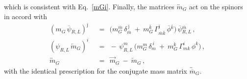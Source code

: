 \documentclass[12pt]{article}
\newcommand{\ov}{\overline}
\newcommand{\bpsi}{\ov{\psi}{}}
\newcommand{\bphi}{\ov{\phi}{}}
\newcommand{\bj}{{\bar \jmath}}
\newcommand{\bk}{{\bar k}}
\newcommand{\bm}{{\bar m}}
\begin{document}
	which is consistent with Eq.~\eqref{mGi}.
	Finally, the matrices $ \overleftrightarrow{m}{}_{\!G} $ act on the spinors in accord with
\begin{align*}
%
	(m_G\, \bpsi_{R,L})^\bj & ~~=~~ 
		\bigl( m_G^\bm\, \delta_{\bm}^{~\bj} ~+~ m_G^\bk\, \Gamma^\bj_{\bm\bk}\, \bphi^\bk \bigr)\, \bpsi_{R,L}^\bm\,,
	\\[2mm]
%
	(\psi_{R,L}\,\overleftarrow{m}{}_{\!G})^i & ~~=~~
		-\, \psi_{R,L}^m\, \bigl( m_G^m\, \delta_m^{~i} ~+~ m_G^k\, \Gamma^i_{mk}\, \phi^k \bigr)\,,
	\\[2mm]
%
	\overleftrightarrow{m}{}_{\!G} & ~~=~~ \overrightarrow{m}{}_{\!G} ~-~ \overleftarrow{m}{}_{\!G}\,,
\end{align*}
	with the identical prescription for the conjugate mass matrix $ \overleftrightarrow{\ov{m}}{}_{\!G} $.
\end{document}
